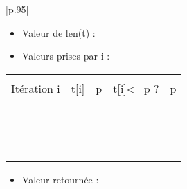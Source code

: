 \documentclass[10pt]{article}
\begin{document}
\begin{center}
\begin{tabular}{|p{.95\linewidth}|}
\hline
\begin{itemize}
\item Valeur de \textsf{len(t)} : \dotfill
\vspace{1cm}
\item Valeurs prises par \textsf{i} : \dotfill
\end{itemize} 
\begin{center}
\begin{tabular}{|p{2cm}|p{2cm}|p{2cm}|p{2cm}|p{2cm}|}
\hline 
& & & & \\
Itération \textsf{i} & \textsf{t[i]} & \textsf{p} & \textsf{t[i]<=p} ? & p \\
& & & & \\
\hline
& & & & \\
& & & & \\
\hline
& & & & \\
& & & & \\
\hline
& & & & \\
& & & & \\
\hline
& & & & \\
& & & & \\
\hline
& & & & \\
& & & & \\
\hline
& & & & \\
& & & & \\
\hline
& & & & \\
& & & & \\
\hline
\end{tabular}
\end{center}
\begin{itemize}
\item Valeur retournée : \dotfill
\end{itemize} 
\\
\hline
\end{tabular}
\end{center}

\newpage
\fi



\subparagraph{}
\textit{}%
\end{document}
